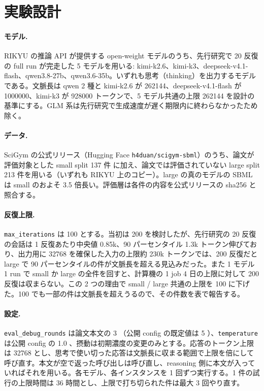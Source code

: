 \documentclass{article}
\begin{document}
\section{実験設計}
\label{sec:design}
\paragraph{モデル.}
RIKYU の推論 API が提供する open-weight モデルのうち、先行研究で 20 反復の full run が完走した 5 モデルを用いる: kimi-k2.6、kimi-k3、deepseek-v4.1-flash、qwen3.8-27b、qwen3.6-35b。いずれも思考（thinking）を出力するモデルである。文脈長は qwen 2 種と kimi-k2.6 が 262144、deepseek-v4.1-flash が 1000000、kimi-k3 が 928000 トークンで、5 モデル共通の上限 262144 を設計の基準にする。GLM 系は先行研究で生成速度が遅く期限内に終わらなかったため除く。

\paragraph{データ.}
SciGym の公式リリース（Hugging Face \texttt{h4duan/scigym-sbml}）のうち、論文が評価対象とした small split 137 件 \cite[s1.p2]{duan-2025-measuring} に加え、論文では評価されていない large split 213 件を用いる（いずれも RIKYU 上のコピー）。large の真のモデルの SBML は small のおよそ 3.5 倍長い。評価層は各件の内容を公式リリースの sha256 と照合する。

\paragraph{反復上限.}
\texttt{max\_iterations} は 100 とする。当初は 200 を検討したが、先行研究の 20 反復の会話は 1 反復あたり中央値 0.85k、90 パーセンタイル 1.3k トークン伸びており、出力用に 32768 を確保した入力の上限約 230k トークンでは、200 反復だと large で 90 パーセンタイルの件が文脈長を超える見込みだった。また 1 モデル 1 run で small か large の全件を回すと、計算機の 1 job 4 日の上限に対して 200 反復は収まらない。この 2 つの理由で small / large 共通の上限を 100 に下げた。100 でも一部の件は文脈長を超えうるので、その件数を表で報告する。

\paragraph{設定.}
\texttt{eval\_debug\_rounds} は論文本文の 3 \cite[s1.p4]{duan-2025-measuring}（公開 config の既定値は 5 \cite[s2.p3]{h4duan-2025-scigym}）、\texttt{temperature} は公開 config の 1.0 \cite[s2.p1]{h4duan-2025-scigym}、摂動は初期濃度の変更のみとする。応答のトークン上限は 32768 とし、思考で使い切った応答は文脈長に収まる範囲で上限を倍にして呼び直す。本文が空で返った呼び出しは呼び直し、reasoning 側に本文が入っていればそれを用いる。各モデル、各インスタンスを 1 回ずつ実行する。1 件の試行の上限時間は 36 時間とし、上限で打ち切られた件は最大 3 回やり直す。
\end{document}
